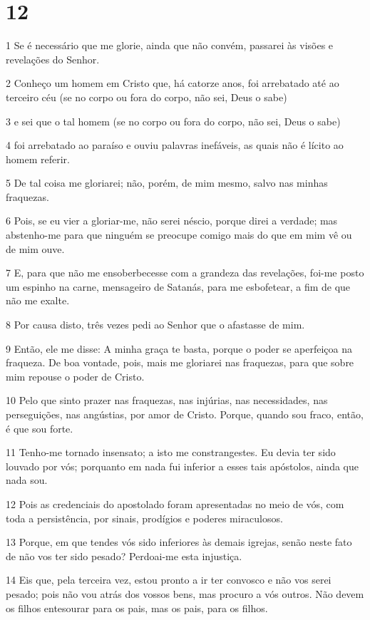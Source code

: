 \chapter{12}

\par 1 Se é necessário que me glorie, ainda que não convém, passarei às visões e revelações do Senhor.
\par 2 Conheço um homem em Cristo que, há catorze anos, foi arrebatado até ao terceiro céu (se no corpo ou fora do corpo, não sei, Deus o sabe)
\par 3 e sei que o tal homem (se no corpo ou fora do corpo, não sei, Deus o sabe)
\par 4 foi arrebatado ao paraíso e ouviu palavras inefáveis, as quais não é lícito ao homem referir.
\par 5 De tal coisa me gloriarei; não, porém, de mim mesmo, salvo nas minhas fraquezas.
\par 6 Pois, se eu vier a gloriar-me, não serei néscio, porque direi a verdade; mas abstenho-me para que ninguém se preocupe comigo mais do que em mim vê ou de mim ouve.
\par 7 E, para que não me ensoberbecesse com a grandeza das revelações, foi-me posto um espinho na carne, mensageiro de Satanás, para me esbofetear, a fim de que não me exalte.
\par 8 Por causa disto, três vezes pedi ao Senhor que o afastasse de mim.
\par 9 Então, ele me disse: A minha graça te basta, porque o poder se aperfeiçoa na fraqueza. De boa vontade, pois, mais me gloriarei nas fraquezas, para que sobre mim repouse o poder de Cristo.
\par 10 Pelo que sinto prazer nas fraquezas, nas injúrias, nas necessidades, nas perseguições, nas angústias, por amor de Cristo. Porque, quando sou fraco, então, é que sou forte.
\par 11 Tenho-me tornado insensato; a isto me constrangestes. Eu devia ter sido louvado por vós; porquanto em nada fui inferior a esses tais apóstolos, ainda que nada sou.
\par 12 Pois as credenciais do apostolado foram apresentadas no meio de vós, com toda a persistência, por sinais, prodígios e poderes miraculosos.
\par 13 Porque, em que tendes vós sido inferiores às demais igrejas, senão neste fato de não vos ter sido pesado? Perdoai-me esta injustiça.
\par 14 Eis que, pela terceira vez, estou pronto a ir ter convosco e não vos serei pesado; pois não vou atrás dos vossos bens, mas procuro a vós outros. Não devem os filhos entesourar para os pais, mas os pais, para os filhos.
